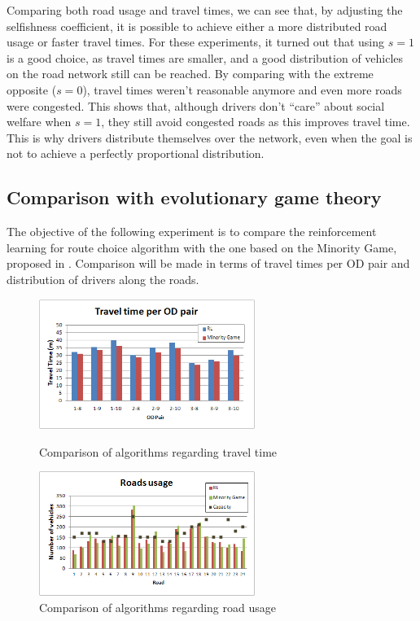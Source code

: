 \documentclass[12pt]{article}
\begin{document}
Comparing both road usage and travel times, we can see that, by adjusting the selfishness coefficient, it is possible to achieve either a more distributed road usage or faster travel times. For these experiments, it turned out that using $s=1$ is a good choice, as travel times are smaller, and a good distribution of vehicles on the road network still can be reached. By comparing with the extreme opposite ($s = 0$), travel times weren't reasonable anymore and even more roads were congested. This shows that, although drivers don't ``care'' about social welfare when $s=1$, they still avoid congested roads as this improves travel time. This is why drivers distribute themselves over the network, even when the goal is not to achieve a perfectly proportional distribution.

\subsection{Comparison with evolutionary game theory}

The objective of the following experiment is to compare the reinforcement learning for route choice algorithm with the one based on the Minority Game, proposed in \cite{Galib&Moser2011}. Comparison will be made in terms of travel times per OD pair and distribution of drivers along the roads. 

\begin{figure}[ht]
    \centerline{\includegraphics[width=7cm]{img/rl_vs_mg_traveltime.png}}
    \caption{Comparison of algorithms regarding travel time}
    \label{fig:travelTimeComparison}
\vspace*{3ex} \centering
    \centerline{\includegraphics[width=7cm]{img/roadsUsage_comparison.png}}
    \caption{Comparison of algorithms regarding road usage}
    \label{fig:roadsUsageComparison}
\end{figure}
\end{document}
